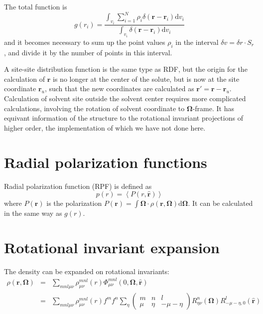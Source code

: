 The total function is 
\begin{equation}
g(r_{i})=\dfrac{\int_{v_{i}}\sum_{i=1}^{N}\rho_{i}\delta(\mathbf{r}-\mathbf{r}_{i})\mathrm{d}v_{i}}{\int_{v_{i}}\delta(\mathbf{r}-\mathbf{r}_{i})\mathrm{d}v_{i}}
\end{equation}
and it becomes necessary to sum up the point values $\rho_{i}$ in the interval
$\delta v=\delta r\cdot S_{r}$, and divide it by the number of points
in this interval.

A site-site distribution function is the same type as \acs{RDF},
but the origin for the calculation of $\mathbf{r}$ is no longer at
the center of the solute, but is now at the site coordinate $\mathbf{r}_{u}$, such
that the new coordinates are calculated as $\mathbf{r}'=\mathbf{r}-\mathbf{r}_{u}$.
Calculation of solvent site outside the solvent center requires more
complicated calculations, involving the rotation of solvent coordinate
to $\mathbf{\Omega}$-frame. It has equivant information of the structure
to the rotational invariant projections of higher order, the implementation of which
we have not done here.

\section{Radial polarization functions}

Radial polarization function (RPF) is defined as 
\begin{equation}
p(r)=\left\langle P(r,\hat{\mathbf{r}})\right\rangle 
\end{equation}
where $P(\mathbf{r})$ is the polarization $P(\mathbf{r})=\int\mathbf{\Omega}\cdot\rho(\mathbf{r},\mathbf{\Omega})\mathrm{d}\mathbf{\Omega}$.
It can be calculated in the same way as $g(r)$.

\section{Rotational invariant expansion}

The density can be expanded on rotational invariants:
\begin{eqnarray}
\rho(\mathbf{r},\mathbf{\Omega}) & = & \sum_{mnl\mu\nu}\rho_{\mu\nu}^{mnl}(r)\Phi_{\mu\nu}^{mnl}(0,\mathbf{\Omega},\mathbf{\hat{r}})\label{eq:rot_invar_expansion}\\
 & = & \sum_{mnl\mu\nu}\rho_{\mu\nu}^{mnl}(r)f^{m}f^{n}\sum_{\eta}\left(\begin{array}{ccc}
m & n & l\\
\mu & \eta & -\mu-\eta
\end{array}\right)R_{\eta\nu}^{n}(\mathbf{\Omega})R_{-\mu-\eta,0}^{l}(\mathbf{\hat{r}})
\end{eqnarray}

